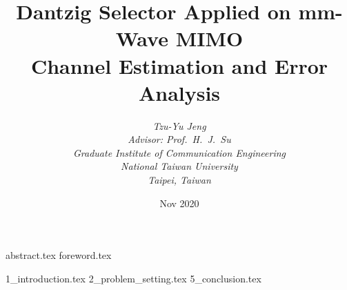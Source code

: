 \documentclass [a4paper, 12pt, twoside, openright] {book}
\begin{document}
\title{
   \textbf {Dantzig Selector Applied on mm-Wave MIMO} \\ \bigskip
   \textbf {Channel Estimation and Error Analysis}
}
\author{
   {\it Tzu-Yu Jeng} \\ \bigskip
   {\it Advisor: Prof.\ H.\ J.\ Su} \\ \bigskip
   {\it Graduate Institute of Communication Engineering} \\ \bigskip
   {\it National Taiwan University} \\ \bigskip
   {\it Taipei, Taiwan}
}
{\date{Nov 2020}}

\hypersetup {pageanchor = false}

\maketitle

\frontmatter
 {abstract.tex}
 {foreword.tex}
\tableofcontents
\listoffigures
\listoftables

\hypersetup {pageanchor = true}

\mainmatter

 {1_introduction.tex}
 {2_problem_setting.tex}
 {5_conclusion.tex}
\printbibliography
\end{document}

